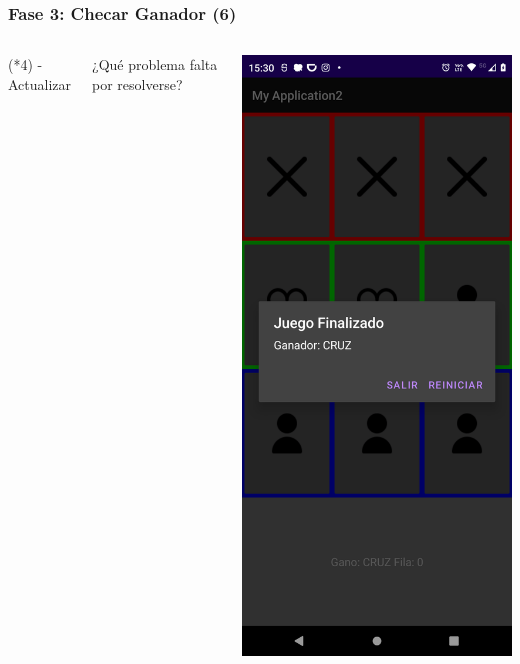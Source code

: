 \begin{frame}[fragile]
\frametitle{Fase 3: Checar Ganador (6)} 
\begin{columns}
\begin{block}{(*4) - Actualizar}
\inputminted[linenos,fontsize=\tiny]{kotlin}{00_ComportamientoAplicacionTicTacToe/listenerVersion2.kt}
\end{block}

\begin{block}{}
¿Qu\'e problema falta por resolverse?
\end{block}

\begin{center}
\includegraphics[width=0.95\linewidth]{00_ComportamientoAplicacionTicTacToe/Etapa3_Fase1A.png}  

\end{center}
\end{columns}
\end{frame}
